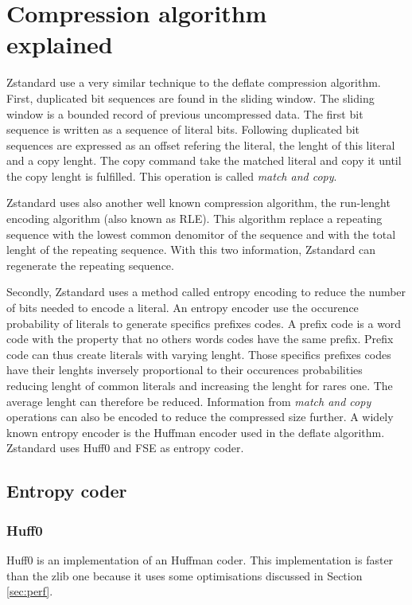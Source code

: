 \documentclass{sig-alternate-05-2015}
\begin{document}
\section{Compression algorithm \\ explained}
    Zstandard use a very similar technique to the deflate compression algorithm. First, duplicated
    bit sequences are found in the sliding window. The sliding window is a bounded record of
    previous uncompressed data.  The first bit sequence is written as a sequence of literal bits.
    Following duplicated bit sequences are expressed as an offset refering the literal, the
    lenght of this literal and a copy lenght. The copy command take the matched
    literal and copy it until the copy lenght is fulfilled. This operation is called \textit{match
    and copy}.

    Zstandard uses also another well known compression algorithm, the run-lenght encoding algorithm
    (also known as RLE). This algorithm replace a repeating sequence with the lowest common
    denomitor of the sequence and with the total lenght of the repeating sequence. With this two
    information, Zstandard can regenerate the repeating sequence.

    Secondly, Zstandard uses a method called entropy encoding to reduce the number of bits needed to
    encode a literal. An entropy encoder use the occurence probability of literals to generate
    specifics prefixes codes. A prefix code is a word code with the property that no others words
    codes have the same prefix. Prefix code can thus create literals with varying lenght. Those
    specifics prefixes codes have their lenghts inversely proportional to their occurences
    probabilities reducing lenght of common literals and increasing the lenght for rares one. The
    average lenght can therefore be reduced. Information from \textit{match and copy} operations can
    also be encoded to reduce the compressed size further. A widely known entropy encoder is the
    Huffman encoder used in the deflate algorithm. Zstandard uses Huff0 and FSE as entropy coder.

    \subsection{Entropy coder}
    \subsubsection{Huff0}
        Huff0 is an implementation of an Huffman coder. This implementation is faster than the
        zlib one because it uses some optimisations discussed in Section \ref{sec:perf}.
\end{document}
